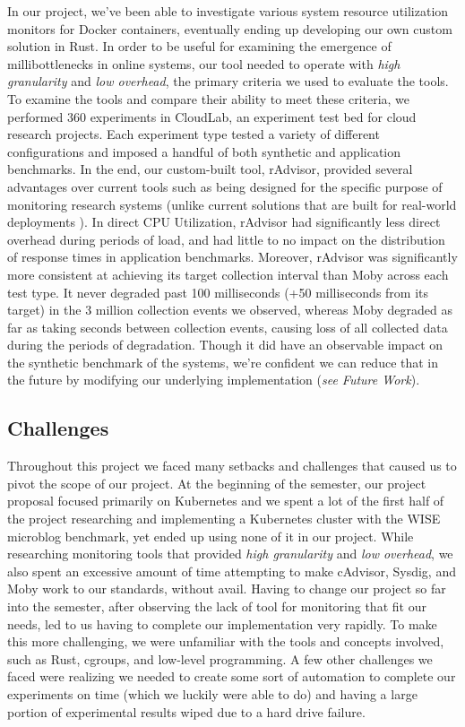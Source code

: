 \documentclass[a4paper,11pt]{article}
\newcommand{\granularity}{\textit{high granularity}\xspace}
\newcommand{\overhead}{\textit{low overhead}\xspace}
\begin{document}
In our project, we've been able to investigate various system resource utilization monitors for Docker containers,
eventually ending up developing our own custom solution in Rust.
In order to be useful for examining the emergence of millibottlenecks in online systems,
our tool needed to operate with \granularity and \overhead,
the primary criteria we used to evaluate the tools.
To examine the tools and compare their ability to meet these criteria,
we performed 360 experiments in CloudLab,
an experiment test bed for cloud research projects.
Each experiment type tested a variety of different configurations
and imposed a handful of both synthetic and application benchmarks.
In the end, our custom-built tool, rAdvisor, provided several advantages over current tools
such as being designed for the specific purpose of monitoring research systems
(unlike current solutions that are built for real-world deployments \cite{SysDig, Cadvisor}).
In direct CPU Utilization, rAdvisor had significantly less direct overhead during periods of load,
and had little to no impact on the distribution of response times in application benchmarks.
Moreover, rAdvisor was significantly more consistent at achieving its target collection interval
than Moby across each test type.
It never degraded past 100 milliseconds (+50 milliseconds from its target)
in the 3 million collection events we observed,
whereas Moby degraded as far as taking seconds between collection events,
causing loss of all collected data during the periods of degradation.
Though it did have an observable impact on the synthetic benchmark of the systems,
we're confident we can reduce that in the future by modifying our underlying implementation (\textit{see Future Work}).

\subsection{Challenges}

Throughout this project we faced many setbacks and challenges that caused us to pivot the scope of our project. 
At the beginning of the semester, our project proposal focused primarily on Kubernetes
and we spent a lot of the first half of the project researching
and implementing a Kubernetes cluster with the WISE microblog benchmark,
yet ended up using none of it in our project.
While researching monitoring tools that provided \granularity and \overhead,
we also spent an excessive amount of time attempting to make cAdvisor, Sysdig, and Moby work to our standards, without avail. 
Having to change our project so far into the semester, 
after observing the lack of tool for monitoring that fit our needs, 
led to us having to complete our implementation very rapidly.
To make this more challenging, we were unfamiliar with the tools and concepts involved,
such as Rust, cgroups, and low-level programming.
A few other challenges we faced were realizing we needed to create some sort of automation to complete our experiments on time
(which we luckily were able to do) and having a large portion of experimental results wiped due to a hard drive failure.
\end{document}
